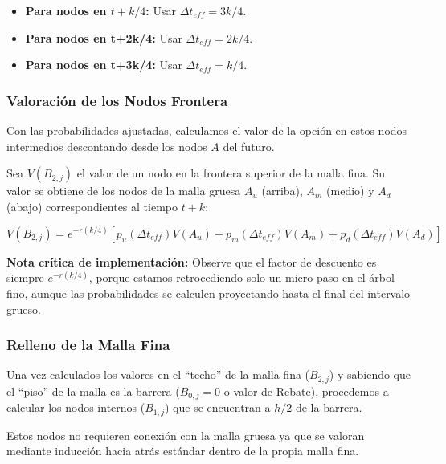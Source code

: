 \begin{itemize} 
  \item \textbf{Para nodos en $t+k/4$:} Usar $\Delta t_{eff}=3k/4$. 

  \item \textbf{Para nodos en t+2k/4:} Usar $\Delta t_{eff}=2k/4$. 
  
  \item \textbf{Para nodos en t+3k/4:} Usar $\Delta t_{eff}=k/4$. 
\end{itemize}

\subsubsection{Valoración de los Nodos Frontera} 

Con las probabilidades ajustadas, calculamos el valor de la opción en estos nodos intermedios descontando desde los nodos $A$ del futuro.

Sea $V(B_{2,j})$ el valor de un nodo en la frontera superior de la malla fina. Su valor se obtiene de los nodos de la malla gruesa $A_u$ (arriba), $A_m$ (medio) y $A_d$ (abajo) correspondientes al tiempo $t+k$:

\begin{equation} 
  V(B_{2,j}) = e^{-r (k/4)} \left[ p_u(\Delta t_{eff}) V(A_u) + p_m(\Delta t_{eff}) V(A_m) + p_d(\Delta t_{eff}) V(A_d) \right] \label{eq:amm_interface_val} 
\end{equation}

\textbf{Nota crítica de implementación:} Observe que el factor de descuento es siempre $e^{-r(k/4)}$, porque estamos retrocediendo solo un micro-paso en el árbol fino, aunque las probabilidades se calculen proyectando hasta el final del intervalo grueso.

\subsubsection{Relleno de la Malla Fina} 

Una vez calculados los valores en el ``techo'' de la malla fina ($B_{2,j}$) y sabiendo que el ``piso'' de la malla es la barrera ($B_{0,j}=0$ o valor de Rebate), procedemos a calcular los nodos internos ($B_{1,j}$) que se encuentran a $h/2$ de la barrera.

Estos nodos no requieren conexión con la malla gruesa ya que se valoran mediante inducción hacia atrás estándar dentro de la propia malla fina.

